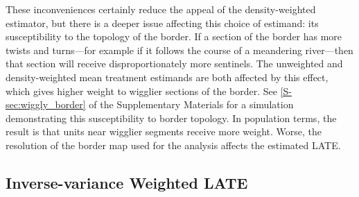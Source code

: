 \documentclass[12pt]{article}
\begin{document}
These inconveniences certainly reduce the appeal of the density-weighted estimator,
but there is a deeper issue affecting this choice of estimand: its susceptibility to the topology of the border.
If a section of the border has more twists and turns---for example if it follows the course of a meandering river---then that section will receive disproportionately more sentinels.
The unweighted and density-weighted mean treatment estimands are both affected by this effect,
which gives higher weight to wigglier sections of the border.
See \autoref*{S-sec:wiggly_border} of the Supplementary Materials for a simulation demonstrating this susceptibility to border topology.
In population terms, the result is that units near wigglier segments receive more weight.
Worse, the resolution of the border map used for the analysis affects the estimated LATE.


\subsection{Inverse-variance Weighted LATE}
\label{sec:invvar}

\end{document}
